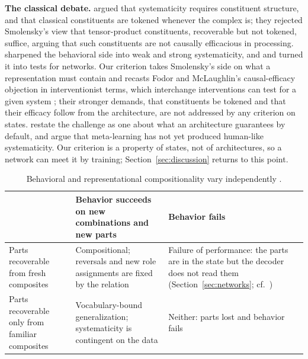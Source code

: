 \documentclass[10pt]{article}
\theoremstyle{plain}
\theoremstyle{remark}
\begin{document}
\textbf{The classical debate.} \citet{fodor1988} argued that systematicity requires constituent structure, and \citet{fodor1990} that classical constituents are tokened whenever the complex is; they rejected Smolensky's view \citep{smolensky1987,smolensky1988,smolensky1990} that tensor-product constituents, recoverable but not tokened, suffice, arguing that such constituents are not causally efficacious in processing. \citet{hadley1994} sharpened the behavioral side into weak and strong systematicity, and \citet{hupkes2020} and \citet{vegner2025} turned it into tests for networks. Our criterion takes Smolensky's side on what a representation must contain and recasts Fodor and McLaughlin's causal-efficacy objection in interventionist terms, which interchange interventions can test for a given system \citep{geiger2021}; their stronger demands, that constituents be tokened and that their efficacy follow from the architecture, are not addressed by any criterion on states. \citet{goodale2026} restate the challenge as one about what an architecture guarantees by default, and \citet{woydt2025} argue that meta-learning \citep{lake2023} has not yet produced human-like systematicity. Our criterion is a property of states, not of architectures, so a network can meet it by training; Section~\ref{sec:discussion} returns to this point.

\begin{table}[t]
  \caption{Behavioral and representational compositionality vary independently \citep[cf.][]{vegner2025}.}
  \label{tab:twobytwo}
  \centering\small
  \begin{tabularx}{\linewidth}{@{}P{3.2cm}YY@{}}
    \toprule
    & Behavior succeeds on new combinations and new parts & Behavior fails \\
    \midrule
    Parts recoverable from fresh composites & Compositional; reversals and new role assignments are fixed by the relation & Failure of performance: the parts are in the state but the decoder does not read them (Section~\ref{sec:networks}; cf.\ \citealt{montero2021}) \\
    Parts recoverable only from familiar composites & Vocabulary-bound generalization; systematicity is contingent on the data \citep{chaabouni2020} & Neither: parts lost and behavior fails \\
    \bottomrule
  \end{tabularx}
\end{table}

\end{document}
